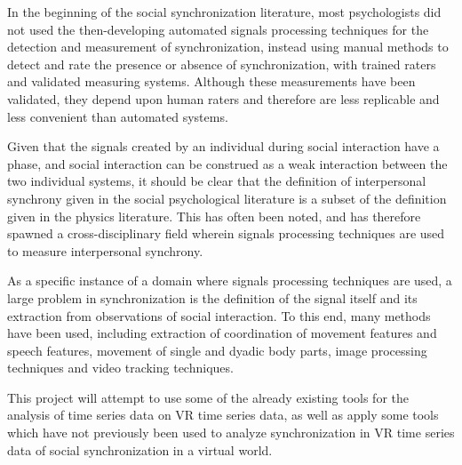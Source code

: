 \documentclass[12pt]{article}
\begin{document}
In the beginning of the social synchronization literature, most psychologists did not used the then-developing automated signals processing techniques for the detection and measurement of synchronization, instead using manual methods to detect and rate the presence or absence of synchronization, with trained raters and validated measuring systems. Although these measurements have been validated, they depend upon human raters and therefore are less replicable and less convenient than automated systems. %

Given that the signals created by an individual during social interaction have a phase, and social interaction can be construed as a weak interaction between the two individual systems, it should be clear that the definition of interpersonal synchrony given in the social psychological literature is a subset of the definition given in the physics literature. This has often been noted, and has therefore spawned a cross-disciplinary field wherein signals processing techniques are used to measure interpersonal synchrony. %

As a specific instance of a domain where signals processing techniques are used, a large problem in synchronization is the definition of the signal itself and its extraction from observations of social interaction. To this end, many methods have been used, including extraction of coordination of movement features and speech features, movement of single and dyadic body parts, image processing techniques and video tracking techniques. %





This project will attempt to use some of the already existing tools for the analysis of time series data on VR time series data, as well as apply some tools which have not previously been used to analyze synchronization in VR time series data of social synchronization in a virtual world.
\end{document}

